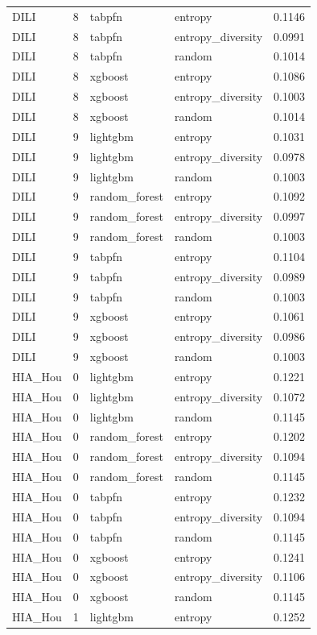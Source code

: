 \begin{tabular}{lrllr}
DILI & 8 & tabpfn & entropy & 0.1146 \\
DILI & 8 & tabpfn & entropy_diversity & 0.0991 \\
DILI & 8 & tabpfn & random & 0.1014 \\
DILI & 8 & xgboost & entropy & 0.1086 \\
DILI & 8 & xgboost & entropy_diversity & 0.1003 \\
DILI & 8 & xgboost & random & 0.1014 \\
DILI & 9 & lightgbm & entropy & 0.1031 \\
DILI & 9 & lightgbm & entropy_diversity & 0.0978 \\
DILI & 9 & lightgbm & random & 0.1003 \\
DILI & 9 & random_forest & entropy & 0.1092 \\
DILI & 9 & random_forest & entropy_diversity & 0.0997 \\
DILI & 9 & random_forest & random & 0.1003 \\
DILI & 9 & tabpfn & entropy & 0.1104 \\
DILI & 9 & tabpfn & entropy_diversity & 0.0989 \\
DILI & 9 & tabpfn & random & 0.1003 \\
DILI & 9 & xgboost & entropy & 0.1061 \\
DILI & 9 & xgboost & entropy_diversity & 0.0986 \\
DILI & 9 & xgboost & random & 0.1003 \\
HIA_Hou & 0 & lightgbm & entropy & 0.1221 \\
HIA_Hou & 0 & lightgbm & entropy_diversity & 0.1072 \\
HIA_Hou & 0 & lightgbm & random & 0.1145 \\
HIA_Hou & 0 & random_forest & entropy & 0.1202 \\
HIA_Hou & 0 & random_forest & entropy_diversity & 0.1094 \\
HIA_Hou & 0 & random_forest & random & 0.1145 \\
HIA_Hou & 0 & tabpfn & entropy & 0.1232 \\
HIA_Hou & 0 & tabpfn & entropy_diversity & 0.1094 \\
HIA_Hou & 0 & tabpfn & random & 0.1145 \\
HIA_Hou & 0 & xgboost & entropy & 0.1241 \\
HIA_Hou & 0 & xgboost & entropy_diversity & 0.1106 \\
HIA_Hou & 0 & xgboost & random & 0.1145 \\
HIA_Hou & 1 & lightgbm & entropy & 0.1252 \\

\end{tabular}
